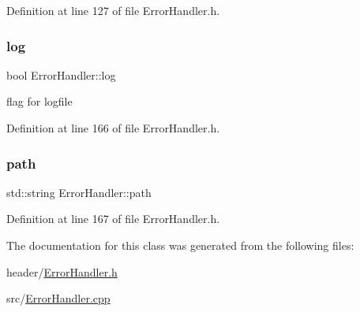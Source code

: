 Definition at line 127 of file Error\+Handler.\+h.

\mbox{\label{classErrorHandler_ad1dc2ca6c4b226730361cc8d7b786e30}} 
\subsubsection{\texorpdfstring{log}{log}}
{\footnotesize\ttfamily bool Error\+Handler\+::log\hspace{0.3cm}{\ttfamily [private]}}

flag for logfile 

Definition at line 166 of file Error\+Handler.\+h.

\mbox{\label{classErrorHandler_aeabbc987b7eaa01b6d006b55b4e00574}} 
\subsubsection{\texorpdfstring{path}{path}}
{\footnotesize\ttfamily std\+::string Error\+Handler\+::path\hspace{0.3cm}{\ttfamily [private]}}



Definition at line 167 of file Error\+Handler.\+h.



The documentation for this class was generated from the following files\+:\begin{DoxyCompactItemize}
\item 
header/\mbox{\hyperlink{ErrorHandler_8h}{Error\+Handler.\+h}}\item 
src/\mbox{\hyperlink{ErrorHandler_8cpp}{Error\+Handler.\+cpp}}\end{DoxyCompactItemize}
